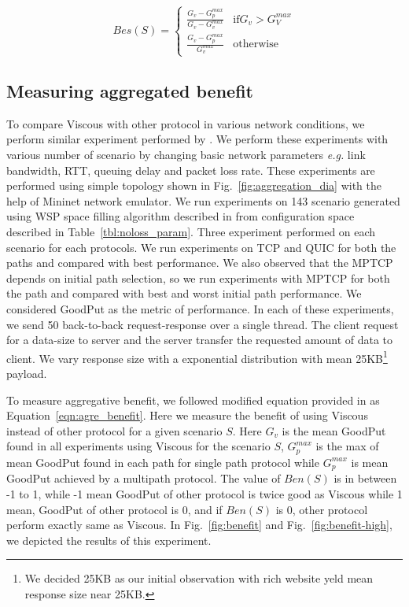 \begin{equation} \label{eqn:agre_benefit}
Bes(S) = 
\begin{cases}
\frac{G_v - G_p^{max}}{G_v - G_v^{max}} & \text{if} G_v > G_V^{max} \\
\frac{G_v - G_p^{max}}{G_v^{max}} & \text{otherwise}
\end{cases}
\end{equation}

\subsection{Measuring aggregated benefit}
To compare Viscous with other protocol in various network conditions, we perform similar experiment performed by \cite{mpquic-measure,Paasch:mptcp:compare}. We perform these experiments with various number of scenario by changing basic network parameters {\it e.g.} link bandwidth, RTT, queuing delay and packet loss rate. These experiments are performed using simple topology shown in Fig.~\ref{fig:aggregation_dia} with the help of Mininet network emulator. We run experiments on 143 scenario generated using WSP	space filling algorithm described in \cite{wspalgo} from configuration space described in Table~\ref{tbl:noloss_param}. Three experiment performed on each scenario for each protocols. We run experiments on TCP and QUIC for both the paths and compared with best performance. We also observed that the MPTCP depends on initial path selection, so we run experiments with MPTCP for both the path and compared with best and worst initial path performance. We considered GoodPut as the metric of performance. In each of these experiments, we send 50 back-to-back request-response over a single thread. The client request for a data-size to server and the server transfer the requested amount of data to client. We vary response size with a exponential distribution with mean 25KB\footnote{We decided 25KB as our initial observation with rich website yeld mean response size near 25KB.} payload.

To measure aggregative benefit, we followed modified equation provided in \cite{Kaspar:2012:MAH:2206765.2206770,Paasch:mptcp:compare,mpquic-measure}
as Equation~\ref{eqn:agre_benefit}. Here we measure the benefit of using Viscous instead of other protocol for a given scenario $S$. Here $G_v$ is the mean GoodPut found in all experiments using Viscous for the scenario $S$, $G_p^{max}$ is the max of mean GoodPut found in each path for single path protocol while $G_p^{max}$ is mean GoodPut achieved by a multipath protocol. The value of $Ben(S)$ is in between -1 to 1, while -1 mean GoodPut of other protocol is twice good as Viscous while 1 mean, GoodPut of other protocol is 0, and if $Ben(S)$ is 0, other protocol perform exactly same as Viscous. In Fig.~\ref{fig:benefit} and Fig.~\ref{fig:benefit-high}, we depicted the results of this experiment.

